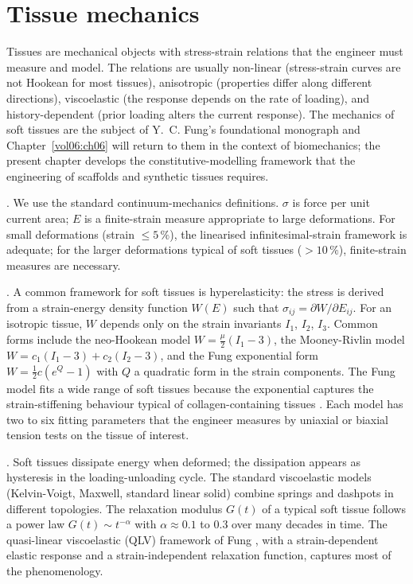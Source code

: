 \section{Tissue mechanics}

Tissues are mechanical objects with stress-strain relations that the
engineer must measure and model. The relations are usually non-linear
(stress-strain curves are not Hookean for most tissues), anisotropic
(properties differ along different directions), viscoelastic (the
response depends on the rate of loading), and history-dependent
(prior loading alters the current response). The mechanics of soft
tissues are the subject of Y.~C. Fung's foundational monograph
\cite{text:fung-biomechanics} and Chapter~\ref{vol06:ch06} will
return to them in the context of biomechanics; the present chapter
develops the constitutive-modelling framework that the engineering
of scaffolds and synthetic tissues requires.

. We use the standard continuum-mechanics
definitions.  $\sigma$ is force per unit
current area;  $E$ is a finite-strain measure
appropriate to large deformations. For small deformations
(strain $\le 5\,\%$), the linearised infinitesimal-strain framework
is adequate; for the larger deformations typical of soft tissues
($> 10\,\%$), finite-strain measures are necessary.

. A common framework for
soft tissues is hyperelasticity: the stress is derived from a
strain-energy density function $W(E)$ such that $\sigma_{ij} =
\partial W/\partial E_{ij}$. For an isotropic tissue, $W$ depends
only on the strain invariants $I_1$, $I_2$, $I_3$. Common forms
include the neo-Hookean model
$W = \frac{\mu}{2}(I_1 - 3)$, the Mooney-Rivlin model
$W = c_1(I_1 - 3) + c_2(I_2 - 3)$, and the Fung exponential form
$W = \frac{1}{2} c (e^{Q} - 1)$ with $Q$ a quadratic form in the
strain components. The Fung model fits a wide range of soft tissues
because the exponential captures the strain-stiffening behaviour
typical of collagen-containing tissues
\cite[ch.~7]{text:fung-biomechanics}. Each model has two to six fitting
parameters that the engineer measures by uniaxial or biaxial tension
tests on the tissue of interest.

. Soft tissues dissipate energy when
deformed; the dissipation appears as hysteresis in the loading-unloading
cycle. The standard viscoelastic models (Kelvin-Voigt, Maxwell,
standard linear solid) combine springs and dashpots in different
topologies. The relaxation modulus $G(t)$ of a typical soft tissue
follows a power law $G(t) \sim t^{-\alpha}$ with $\alpha \approx 0.1$
to $0.3$ over many decades in time. The quasi-linear viscoelastic
(QLV) framework of Fung \cite{paper:v6c05-fung-qlv-1972}, with a
strain-dependent elastic response and a strain-independent
relaxation function, captures most of the phenomenology.

